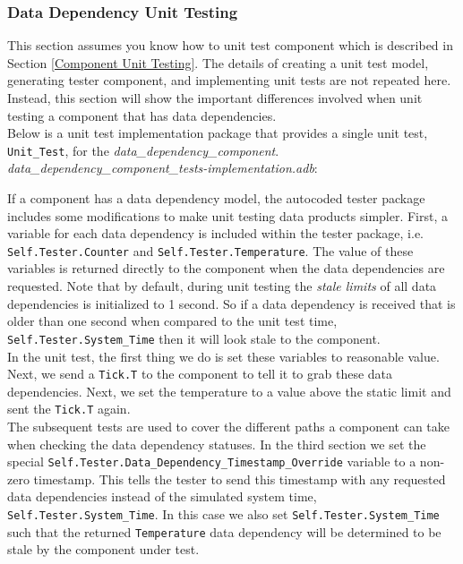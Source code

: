 \subsubsection{Data Dependency Unit Testing}

This section assumes you know how to unit test component which is described in Section \ref{Component Unit Testing}. The details of creating a unit test model, generating tester component, and implementing unit tests are not repeated here. Instead, this section will show the important differences involved when unit testing a component that has data dependencies. \\

Below is a unit test implementation package that provides a single unit test, \texttt{Unit\_Test}, for the \textit{data\_dependency\_component}. \\

\textit{data\_dependency\_component\_tests-implementation.adb}:

If a component has a data dependency model, the autocoded tester package includes some modifications to make unit testing data products simpler. First, a variable for each data dependency is included within the tester package, i.e. \texttt{Self.Tester.Counter} and \texttt{Self.Tester.Temperature}. The value of these variables is returned directly to the component when the data dependencies are requested. Note that by default, during unit testing the \textit{stale limits} of all data dependencies is initialized to 1 second. So if a data dependency is received that is older than one second when compared to the unit test time, \texttt{Self.Tester.System\_Time} then it will look stale to the component. \\

In the unit test, the first thing we do is set these variables to reasonable value. Next, we send a \texttt{Tick.T} to the component to tell it to grab these data dependencies. Next, we set the temperature to a value above the static limit and sent the \texttt{Tick.T} again. \\

The subsequent tests are used to cover the different paths a component can take when checking the data dependency statuses. In the third section we set the special \texttt{Self.Tester.Data\_Dependency\_Timestamp\_Override} variable to a non-zero timestamp. This tells the tester to send this timestamp with any requested data dependencies instead of the simulated system time, \texttt{Self.Tester.System\_Time}. In this case we also set \texttt{Self.Tester.System\_Time} such that the returned \texttt{Temperature} data dependency will be determined to be stale by the component under test. \\

